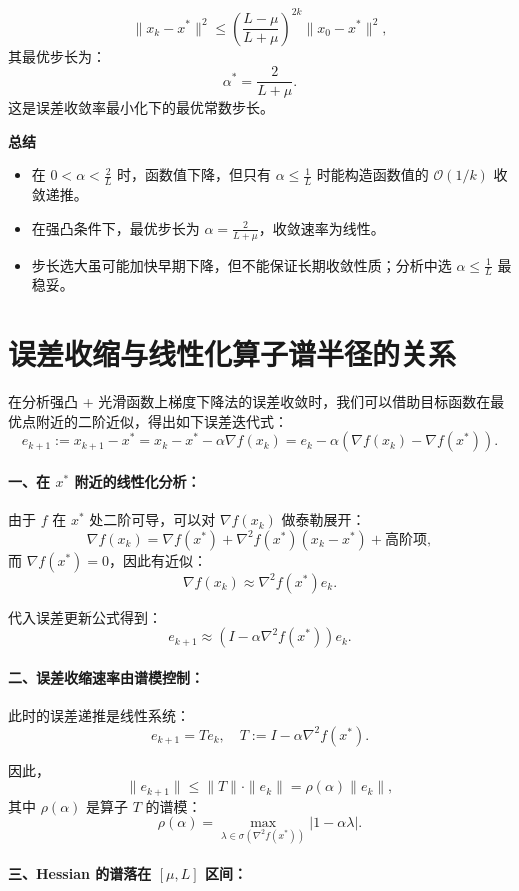 \[
\|x_k - x^*\|^2 \le \left( \frac{L - \mu}{L + \mu} \right)^{2k} \|x_0 - x^*\|^2,
\]
其最优步长为：
\[
\boxed{\alpha^* = \frac{2}{L + \mu}}.
\]
这是误差收敛率最小化下的最优常数步长。

\textbf{总结}

\begin{itemize}
	\item 在 $0 < \alpha < \frac{2}{L}$ 时，函数值下降，但只有 $\alpha \le \frac{1}{L}$ 时能构造函数值的 $\mathcal{O}(1/k)$ 收敛递推。
	\item 在强凸条件下，最优步长为 $\alpha = \frac{2}{L + \mu}$，收敛速率为线性。
	\item 步长选大虽可能加快早期下降，但不能保证长期收敛性质；分析中选 $\alpha \le \frac{1}{L}$ 最稳妥。
\end{itemize}
\newpage
\section{误差收缩与线性化算子谱半径的关系}

在分析强凸 + 光滑函数上梯度下降法的误差收敛时，我们可以借助目标函数在最优点附近的二阶近似，得出如下误差迭代式：
\[
e_{k+1} := x_{k+1} - x^* = x_k - x^* - \alpha \nabla f(x_k) = e_k - \alpha (\nabla f(x_k) - \nabla f(x^*)).
\]

\paragraph{一、在 $x^*$ 附近的线性化分析：}

由于 $f$ 在 $x^*$ 处二阶可导，可以对 $\nabla f(x_k)$ 做泰勒展开：
\[
\nabla f(x_k) = \nabla f(x^*) + \nabla^2 f(x^*)(x_k - x^*) + \text{高阶项},
\]
而 $\nabla f(x^*) = 0$，因此有近似：
\[
\nabla f(x_k) \approx \nabla^2 f(x^*) e_k.
\]

代入误差更新公式得到：
\[
e_{k+1} \approx (I - \alpha \nabla^2 f(x^*)) e_k.
\]

\paragraph{二、误差收缩速率由谱模控制：}

此时的误差递推是线性系统：
\[
e_{k+1} = T e_k, \quad T := I - \alpha \nabla^2 f(x^*).
\]

因此，
\[
\|e_{k+1}\| \le \|T\| \cdot \|e_k\| = \rho(\alpha) \|e_k\|,
\]
其中 $\rho(\alpha)$ 是算子 $T$ 的谱模：
\[
\rho(\alpha) = \max_{\lambda \in \sigma(\nabla^2 f(x^*))} |1 - \alpha \lambda|.
\]

\paragraph{三、Hessian 的谱落在 $[\mu, L]$ 区间：}


